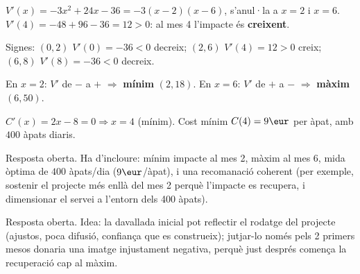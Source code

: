 \begin{solucions}
\begin{sollist}
  \item $V'(x)=-3x^2+24x-36=-3(x-2)(x-6)$, s'anul·la a $x=2$ i $x=6$.
        $V'(4)=-48+96-36=12>0$: al mes 4 l'impacte és \textbf{creixent}.
  \item Signes: $(0,2)$ $V'(0)=-36<0$ decreix; $(2,6)$ $V'(4)=12>0$ creix; $(6,8)$
        $V'(8)=-36<0$ decreix.
  \item En $x=2$: $V'$ de $-$ a $+$ $\Rightarrow$ \textbf{mínim} $(2,18)$. En $x=6$: $V'$
        de $+$ a $-$ $\Rightarrow$ \textbf{màxim} $(6,50)$.
  \item $C'(x)=2x-8=0\Rightarrow x=4$ (mínim). Cost mínim $C(4)=9\eur$ per àpat, amb
        $400$ àpats diaris.
  \item Resposta oberta. Ha d'incloure: mínim impacte al mes 2, màxim al mes 6, mida
        òptima de $400$ àpats/dia ($9\eur$/àpat), i una recomanació coherent (per exemple,
        sostenir el projecte més enllà del mes 2 perquè l'impacte es recupera, i
        dimensionar el servei a l'entorn dels 400 àpats).
  \item Resposta oberta. Idea: la davallada inicial pot reflectir el rodatge del projecte
        (ajustos, poca difusió, confiança que es construeix); jutjar-lo només pels 2
        primers mesos donaria una imatge injustament negativa, perquè just després
        comença la recuperació cap al màxim.
\end{sollist}
\end{solucions}
